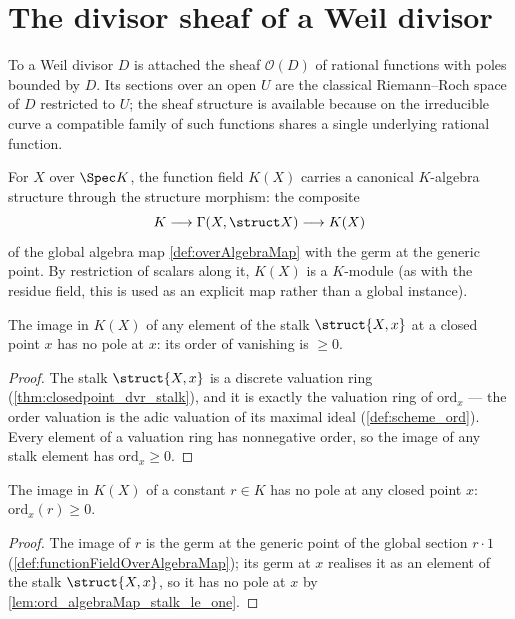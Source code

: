 \section{The divisor sheaf of a Weil divisor}

To a Weil divisor \(D\) is attached the sheaf \(\mathcal O(D)\) of rational functions with poles
bounded by \(D\). Its sections over an open \(U\) are the classical Riemann--Roch space of \(D\)
restricted to \(U\); the sheaf structure is available because on the irreducible curve a compatible
family of such functions shares a single underlying rational function.

\begin{definition}
  \label{def:functionFieldOverAlgebraMap}
  \leanok
  For \(X\) over \(\Spec K\), the function field \(K(X)\) carries a canonical \(K\)-algebra structure
  through the structure morphism: the composite
  \[
    K \longrightarrow \Gamma(X, \struct X) \longrightarrow K(X)
  \]
  of the global algebra map \ref{def:overAlgebraMap} with the germ at the generic point. By
  restriction of scalars along it, \(K(X)\) is a \(K\)-module (as with the residue field, this is
  used as an explicit map rather than a global instance).
\end{definition}

\begin{lemma}
  \label{lem:ord_algebraMap_stalk_le_one}
  \leanok
  The image in \(K(X)\) of any element of the stalk \(\struct{X,x}\) at a closed point \(x\) has no
  pole at \(x\): its order of vanishing is \(\ge 0\).
\end{lemma}
\begin{proof}
  \leanok
  The stalk \(\struct{X,x}\) is a discrete valuation ring (\ref{thm:closedpoint_dvr_stalk}), and it
  is exactly the valuation ring of \(\mathrm{ord}_x\) --- the order valuation is the adic valuation
  of its maximal ideal (\ref{def:scheme_ord}). Every element of a valuation ring has nonnegative
  order, so the image of any stalk element has \(\mathrm{ord}_x \ge 0\).
\end{proof}

\begin{lemma}
  \label{lem:ord_functionFieldOverAlgebraMap_le_one}
  \leanok
  The image in \(K(X)\) of a constant \(r \in K\) has no pole at any closed point \(x\):
  \(\mathrm{ord}_x(r) \ge 0\).
\end{lemma}
\begin{proof}
  \leanok
  The image of \(r\) is the germ at the generic point of the global section \(r \cdot 1\)
  (\ref{def:functionFieldOverAlgebraMap}); its germ at \(x\) realises it as an element of the stalk
  \(\struct{X,x}\), so it has no pole at \(x\) by \ref{lem:ord_algebraMap_stalk_le_one}.
\end{proof}

